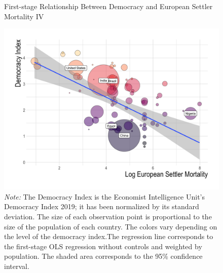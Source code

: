 \begin{figure}[H]
\centering
\caption{First-stage Relationship Between Democracy and European Settler Mortality IV}\label{fig:first-stage}
\includegraphics[width=5in]{plots/dem_logem_noControls_popWeighted_1stStage.png}
\caption*{\textit{Note:} The Democracy Index is the Economist Intelligence Unit's Democracy Index 2019; it has been normalized by its standard deviation. The size of each observation point is proportional to the size of the population of each country. The colors vary depending on the level of the democracy index.The regression line corresponds to the first-stage OLS regression without controls and weighted by population. The shaded area corresponds to the 95\% confidence interval.}
\end{figure}